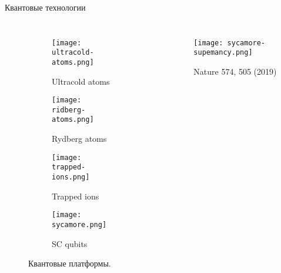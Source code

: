 \begin{frame}{Квантовые технологии}
  \begin{columns}
   \begin{figure}
     \begin{subfigure}[t]{0.33\textwidth}
       \texttt{[image: ultracold-atoms.png]}
       \caption{Ultracold atoms}
       \label{fig:ultracold-atoms}
     \end{subfigure}
     \begin{subfigure}[t]{0.33\textwidth}
       \texttt{[image: ridberg-atoms.png]}
       \caption{Rydberg atoms}
     \end{subfigure}
     \vfill
     \begin{subfigure}[t]{0.33\textwidth}
       \texttt{[image: trapped-ions.png]}
       \caption{Trapped ions}
     \end{subfigure}
     \begin{subfigure}[t]{0.33\textwidth}
       \texttt{[image: sycamore.png]}
       \caption{SC qubits}
     \end{subfigure}
     \caption{
       Квантовые платформы.
     }
   \end{figure}

   \begin{figure}
       \texttt{[image: sycamore-supemancy.png]}
       \caption{
         Nature 574, 505 (2019)
       }
     \end{figure}
   \end{columns}
\end{frame}


